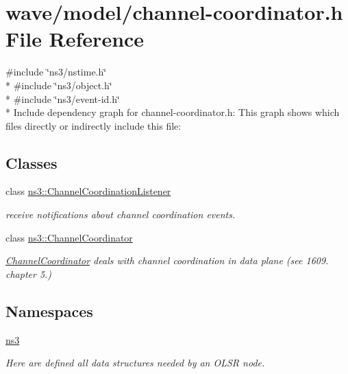 \hypertarget{channel-coordinator_8h}{}\section{wave/model/channel-\/coordinator.h File Reference}
\label{channel-coordinator_8h}
{\ttfamily \#include \char`\"{}ns3/nstime.\+h\char`\"{}}\\*
{\ttfamily \#include \char`\"{}ns3/object.\+h\char`\"{}}\\*
{\ttfamily \#include \char`\"{}ns3/event-\/id.\+h\char`\"{}}\\*
Include dependency graph for channel-\/coordinator.h\+:
This graph shows which files directly or indirectly include this file\+:
\subsection*{Classes}
\begin{DoxyCompactItemize}
\item 
class \hyperlink{classns3_1_1ChannelCoordinationListener}{ns3\+::\+Channel\+Coordination\+Listener}
\begin{DoxyCompactList}\small\item\em receive notifications about channel coordination events. \end{DoxyCompactList}\item 
class \hyperlink{classns3_1_1ChannelCoordinator}{ns3\+::\+Channel\+Coordinator}
\begin{DoxyCompactList}\small\item\em \hyperlink{classns3_1_1ChannelCoordinator}{Channel\+Coordinator} deals with channel coordination in data plane (see 1609. chapter 5.) \end{DoxyCompactList}\end{DoxyCompactItemize}
\subsection*{Namespaces}
\begin{DoxyCompactItemize}
\item 
 \hyperlink{namespacens3}{ns3}
\begin{DoxyCompactList}\small\item\em Here are defined all data structures needed by an O\+L\+SR node. \end{DoxyCompactList}\end{DoxyCompactItemize}
